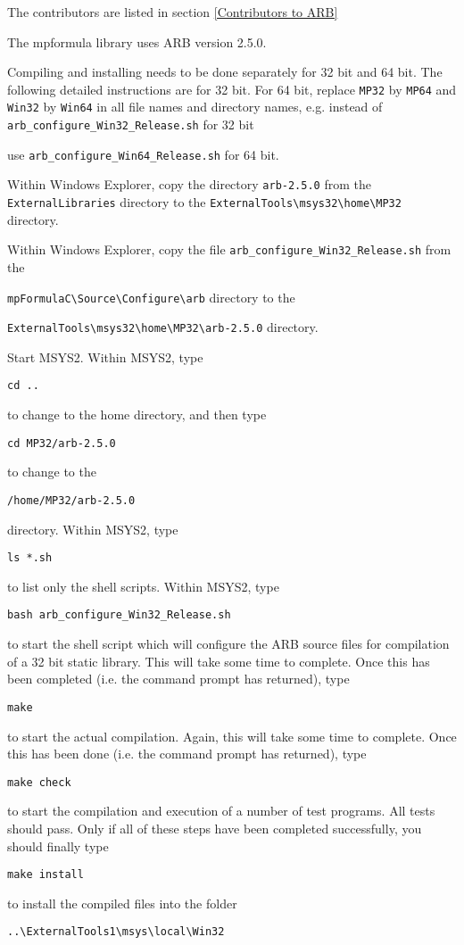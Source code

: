 The contributors are listed in section \ref{Contributors to ARB}

The mpformula library uses ARB version 2.5.0.



\vpara
Compiling and installing needs to be done separately for 32 bit and 64 bit. The following detailed instructions are for 32 bit. For 64 bit, replace \verb|MP32| by \verb|MP64| and \verb|Win32| by  \verb|Win64| in all file names and directory names, e.g. instead of \verb|arb_configure_Win32_Release.sh| for 32 bit

use \verb|arb_configure_Win64_Release.sh| for 64 bit.

\vpara
Within Windows Explorer, copy the directory \verb|arb-2.5.0|  from the \verb|ExternalLibraries|
directory to the \verb|ExternalTools\msys32\home\MP32| directory. 

\vpara
Within Windows Explorer, copy the file \verb|arb_configure_Win32_Release.sh|  from the

\verb|mpFormulaC\Source\Configure\arb| directory to the 

\verb|ExternalTools\msys32\home\MP32\arb-2.5.0| directory.  


\vpara
Start MSYS2. Within MSYS2, type
\begin{verbatim}
cd ..
\end{verbatim}
to change to the home directory, and then type 
\begin{verbatim}
cd MP32/arb-2.5.0
\end{verbatim}
to change to the
\begin{verbatim}
/home/MP32/arb-2.5.0
\end{verbatim}
directory. Within MSYS2, type
\begin{verbatim}
ls *.sh
\end{verbatim}
to list only the shell scripts. Within MSYS2, type
\begin{verbatim}
bash arb_configure_Win32_Release.sh
\end{verbatim}
to start the shell script which will configure the ARB source files for compilation of a 32 bit static library. This will take some time to complete. Once this has been completed (i.e. the command prompt has returned), type
\begin{verbatim}
make
\end{verbatim}
to start the actual compilation. Again, this will take some time to complete. Once this has been done (i.e. the command prompt has returned), type
\begin{verbatim}
make check
\end{verbatim}
to start the compilation and execution of a number of test programs. All tests should pass. Only if all of these steps have been completed successfully, you should finally type
\begin{verbatim}
make install
\end{verbatim}
to install the compiled files into the folder
\begin{verbatim}
..\ExternalTools1\msys\local\Win32
\end{verbatim}



